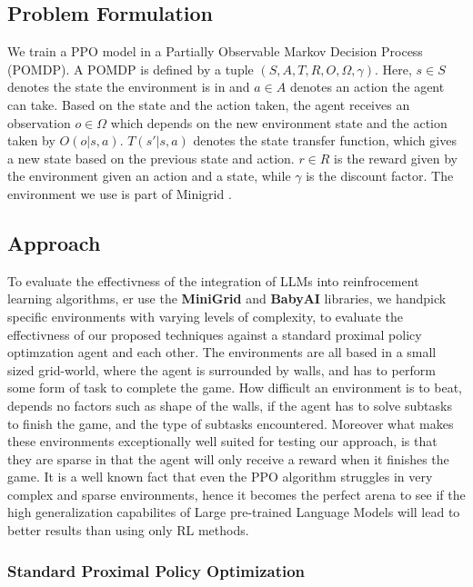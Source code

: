 \documentclass[conference]{IEEEtran}
\begin{document}
\subsection{Problem Formulation}

We train a PPO model in a Partially Observable Markov Decision Process (POMDP). A POMDP is defined by a tuple $(S, A, T, R, O, \Omega, \gamma)$. Here, $s \in S$ denotes the state the environment is in and $a \in A$ denotes an action the agent can take. Based on the state and the action taken, the agent receives an observation $o \in \Omega$ which depends on the new environment state and the action taken by $O(o | s, a)$. $T(s' | s, a)$ denotes the state transfer function, which gives a new state based on the previous state and action. $r \in R$ is the reward given by the environment given an action and a state, while $\gamma$ is the discount factor.  The environment we use is part of Minigrid \cite{minigrid}. 

\subsection{Approach}

To evaluate the effectivness of the integration of LLMs into reinfrocement learning algorithms, er use the \textbf{MiniGrid} and \textbf{BabyAI} libraries, we handpick specific environments with varying levels of complexity, to evaluate the effectivness of our proposed techniques against a standard proximal policy optimzation agent and each other. The environments are all based in a small sized grid-world, where the agent is surrounded by walls, and has to perform some form of task to complete the game. How difficult an environment is to beat, depends no factors such as shape of the walls, if the agent has to solve subtasks to finish the game, and the type of subtasks encountered. Moreover what makes these environments exceptionally well suited for testing our approach, is that they are sparse in that the agent will only receive a reward when it finishes the game. It is a well known fact that even the PPO algorithm struggles in very complex and sparse environments, hence it becomes the perfect arena to see if the high generalization capabilites of Large pre-trained Language Models will lead to better results than using only RL methods.


\subsubsection{Standard Proximal Policy Optimization}
\end{document}
